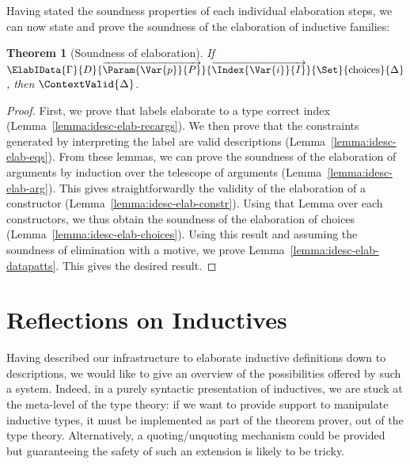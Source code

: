 \documentclass{scrartcl}
\theoremstyle{plain}
\newtheorem{theorem}{Theorem}
\theoremstyle{definition}
\begin{document}
Having stated the soundness properties of each individual elaboration
steps, we can now state and prove the soundness of the elaboration of
inductive families:
\begin{theorem}[Soundness of elaboration]

If 
\(\ElabIData{\Gamma}
            {D}
            {\overrightarrow{\Param{\Var{p}}{P}}}
            {\overrightarrow{\Index{\Var{i}}{I}}}
            {\Set}
            {\mathrm{choices}}
            {\Delta}\), then
\(\ContextValid{\Delta}\).

\end{theorem}
\begin{proof}

First, we prove that labels elaborate to a type correct index
(Lemma~\ref{lemma:idesc-elab-recargs}). We then prove that the
constraints generated by interpreting the label are valid descriptions
(Lemma~\ref{lemma:idesc-elab-eqs}). From these lemmas, we can prove
the soundness of the elaboration of arguments by induction over the
telescope of arguments (Lemma~\ref{lemma:idesc-elab-arg}). This gives
straightforwardly the validity of the elaboration of a constructor
(Lemma~\ref{lemma:idesc-elab-constr}). Using that Lemma over each
constructors, we thus obtain the soundness of the elaboration of
choices (Lemma~\ref{lemma:idesc-elab-choices}). Using this result and
assuming the soundness of elimination with a motive, we prove
Lemma~\ref{lemma:idesc-elab-datapatts}. This gives the desired result.

\end{proof}



\section{Reflections on Inductives}
\label{sec:discussion}




Having described our infrastructure to elaborate inductive definitions
down to descriptions, we would like to give an overview of the
possibilities offered by such a system. Indeed, in a purely syntactic
presentation of inductives, we are stuck at the meta-level of the type
theory: if we want to provide support to manipulate inductive types,
it must be implemented as part of the theorem prover, out of the type
theory. Alternatively, a quoting/unquoting mechanism could be provided
but guaranteeing the safety of such an extension is likely to be
tricky.
\end{document}
